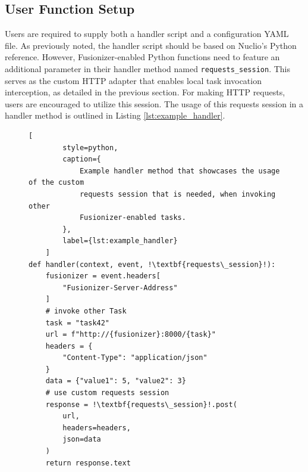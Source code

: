 \subsection{User Function Setup}


Users are required to supply both a handler script and a configuration YAML
file. As previously noted, the handler script should be based on Nuclio's Python
reference. However, Fusionizer-enabled Python functions need to feature an
additional parameter in their handler method named \texttt{requests\_session}.
This serves as the custom HTTP adapter that enables local task invocation
interception, as detailed in the previous section. For making HTTP requests,
users are encouraged to utilize this session. The usage of this requests session
in a handler method is outlined in Listing \ref{lst:example_handler}.

\begin{figure}
    \begin{lstlisting}[
        style=python,
        caption={
            Example handler method that showcases the usage of the custom
            requests session that is needed, when invoking other
            Fusionizer-enabled tasks.
        },
        label={lst:example_handler}
    ]
def handler(context, event, !\textbf{requests\_session}!):
    fusionizer = event.headers[
        "Fusionizer-Server-Address"
    ]
    # invoke other Task
    task = "task42"
    url = f"http://{fusionizer}:8000/{task}"
    headers = {
        "Content-Type": "application/json"
    }
    data = {"value1": 5, "value2": 3}
    # use custom requests session
    response = !\textbf{requests\_session}!.post(
        url,
        headers=headers,
        json=data
    )
    return response.text
    \end{lstlisting}
\end{figure}


